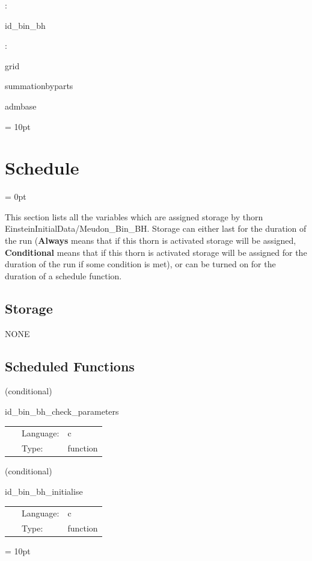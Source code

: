 : 

id\_bin\_bh
\vspace{2mm}

: 

grid

summationbyparts

admbase
\vspace{2mm}

\vspace{5mm}\parskip = 10pt 

\section{Schedule} 


\parskip = 0pt


\noindent This section lists all the variables which are assigned storage by thorn EinsteinInitialData/Meudon\_Bin\_BH.  Storage can either last for the duration of the run ({\bf Always} means that if this thorn is activated storage will be assigned, {\bf Conditional} means that if this thorn is activated storage will be assigned for the duration of the run if some condition is met), or can be turned on for the duration of a schedule function.


\subsection*{Storage}NONE
\subsection*{Scheduled Functions}
\vspace{5mm}

   (conditional) 

\hspace{5mm} id\_bin\_bh\_check\_parameters 

\hspace{5mm}{\it check parameters } 


\hspace{5mm}

 \begin{tabular*}{160mm}{cll} 
~ & Language:  & c \\ 
~ & Type:  & function \\ 
\end{tabular*} 


\vspace{5mm}

   (conditional) 

\hspace{5mm} id\_bin\_bh\_initialise 

\hspace{5mm}{\it set up binary black hole initial data } 


\hspace{5mm}

 \begin{tabular*}{160mm}{cll} 
~ & Language:  & c \\ 
~ & Type:  & function \\ 
\end{tabular*} 



\vspace{5mm}\parskip = 10pt 

